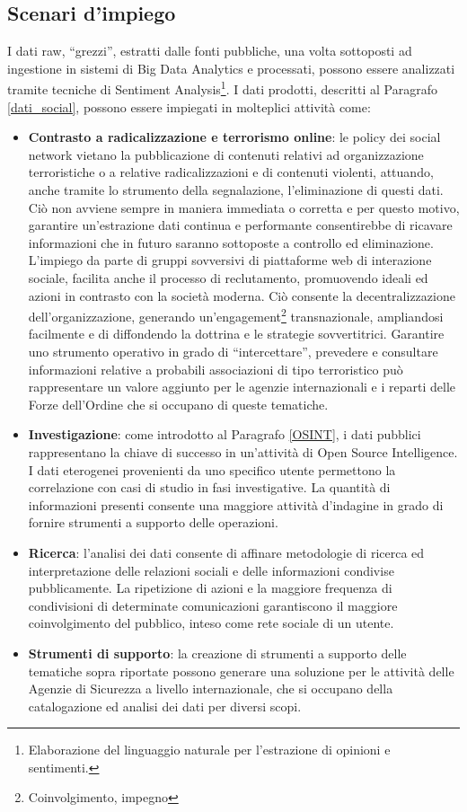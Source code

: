 \subsection{Scenari d'impiego}
I dati raw, ``grezzi'', estratti dalle fonti pubbliche, una volta sottoposti ad ingestione in sistemi di Big Data Analytics e processati, possono essere analizzati tramite tecniche di Sentiment Analysis\footnote{Elaborazione del linguaggio naturale per l'estrazione di opinioni e sentimenti.}.
I dati prodotti, descritti al Paragrafo \ref{dati_social}, possono essere impiegati in molteplici attivit\`a come:
\begin{itemize}
    \item \textbf{Contrasto a radicalizzazione e terrorismo online}: le policy dei social network vietano la pubblicazione di contenuti relativi ad organizzazione terroristiche o a relative radicalizzazioni e di contenuti violenti, attuando, anche tramite lo strumento della segnalazione, l'eliminazione di questi dati. Ci\`o non avviene sempre in maniera immediata o corretta e per questo motivo, garantire un'estrazione dati continua e performante consentirebbe di ricavare informazioni che in futuro saranno sottoposte a controllo ed eliminazione.
    L'impiego da parte di gruppi sovversivi di piattaforme web di interazione sociale, facilita anche il processo di reclutamento, promuovendo ideali ed azioni in contrasto con la societ\`a moderna.
    Ci\`o consente la decentralizzazione dell'organizzazione, generando un'engagement\footnote{Coinvolgimento, impegno} transnazionale, ampliandosi facilmente e di diffondendo la dottrina e le strategie sovvertitrici. \cite{lesser1999countering}
    Garantire uno strumento operativo in grado di ``intercettare'', prevedere e consultare informazioni relative a probabili associazioni di tipo terroristico pu\`o rappresentare un valore aggiunto per le agenzie internazionali e i reparti delle Forze dell'Ordine che si occupano di queste tematiche.
    \item \textbf{Investigazione}: come introdotto al Paragrafo \ref{OSINT}, i dati pubblici rappresentano la chiave di successo in un'attivit\`a di Open Source Intelligence. I dati eterogenei provenienti da uno specifico utente permettono la correlazione con casi di studio in fasi investigative. La quantit\`a di informazioni presenti consente una maggiore attivit\`a d'indagine in grado di fornire strumenti a supporto delle operazioni. 
    \item \textbf{Ricerca}: l'analisi dei dati consente di affinare metodologie di ricerca ed interpretazione delle relazioni sociali e delle informazioni condivise pubblicamente. La ripetizione di azioni e la maggiore frequenza di condivisioni di determinate comunicazioni garantiscono il maggiore coinvolgimento del pubblico, inteso come rete sociale di un utente.  
    \item \textbf{Strumenti di supporto}: la creazione di strumenti a supporto delle tematiche sopra riportate possono generare una soluzione per le attivit\`a delle Agenzie di Sicurezza a livello internazionale, che si occupano della catalogazione ed analisi dei dati per diversi scopi. 
\end{itemize}
